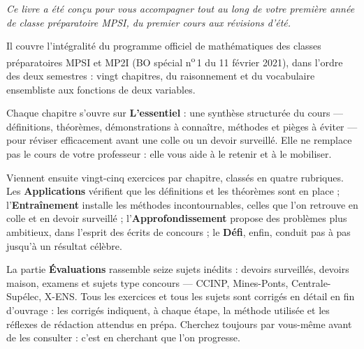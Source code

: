 \thispagestyle{otFront}

\begin{minipage}{128mm}
{\fontsize{14}{20}\selectfont\itshape\color{otNavy}
Ce livre a été conçu pour vous accompagner tout au long de votre première
année de classe préparatoire MPSI, du premier cours aux révisions d'été.\par}
\vspace{7mm}

\fontsize{11}{16}\selectfont
Il couvre l'intégralité du programme officiel de mathématiques des classes
préparatoires MPSI et MP2I (BO spécial n\textsuperscript{o}\,1 du 11 février
2021), dans l'ordre des deux semestres : vingt chapitres, du raisonnement et
du vocabulaire ensembliste aux fonctions de deux variables.\par\vspace{3.5mm}

Chaque chapitre s'ouvre sur \textbf{L'essentiel} : une synthèse structurée du
cours — définitions, théorèmes, démonstrations à connaître, méthodes et
pièges à éviter — pour réviser efficacement avant une colle ou un devoir
surveillé. Elle ne remplace pas le cours de votre professeur : elle vous aide
à le retenir et à le mobiliser.\par\vspace{3.5mm}

Viennent ensuite vingt-cinq exercices par chapitre, classés en quatre
rubriques. Les \textbf{Applications} vérifient que les définitions et les
théorèmes sont en place ; l'\textbf{Entraînement} installe les méthodes
incontournables, celles que l'on retrouve en colle et en devoir surveillé ;
l'\textbf{Approfondissement} propose des problèmes plus ambitieux, dans
l'esprit des écrits de concours ; le \textbf{Défi}, enfin, conduit pas à pas
jusqu'à un résultat célèbre.\par\vspace{3.5mm}

La partie \textbf{Évaluations} rassemble seize sujets inédits : devoirs
surveillés, devoirs maison, examens et sujets type concours — CCINP,
Mines-Ponts, Centrale-Supélec, X-ENS. Tous les exercices et tous les sujets
sont corrigés en détail en fin d'ouvrage : les corrigés indiquent, à chaque
étape, la méthode utilisée et les réflexes de rédaction attendus en prépa.
Cherchez toujours par vous-même avant de les consulter : c'est en cherchant
que l'on progresse.\par\vspace{3.5mm}


\end{minipage}
